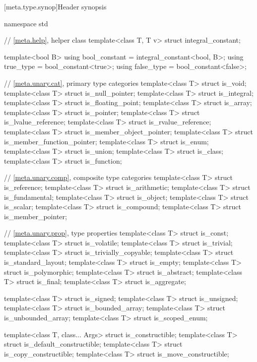 [meta.type.synop]{Header  synopsis}

%
\begin{codeblock}
namespace std {
  // \ref{meta.help}, helper class
  template<class T, T v> struct integral_constant;

  template<bool B>
    using bool_constant = integral_constant<bool, B>;
  using true_type  = bool_constant<true>;
  using false_type = bool_constant<false>;

  // \ref{meta.unary.cat}, primary type categories
  template<class T> struct is_void;
  template<class T> struct is_null_pointer;
  template<class T> struct is_integral;
  template<class T> struct is_floating_point;
  template<class T> struct is_array;
  template<class T> struct is_pointer;
  template<class T> struct is_lvalue_reference;
  template<class T> struct is_rvalue_reference;
  template<class T> struct is_member_object_pointer;
  template<class T> struct is_member_function_pointer;
  template<class T> struct is_enum;
  template<class T> struct is_union;
  template<class T> struct is_class;
  template<class T> struct is_function;

  // \ref{meta.unary.comp}, composite type categories
  template<class T> struct is_reference;
  template<class T> struct is_arithmetic;
  template<class T> struct is_fundamental;
  template<class T> struct is_object;
  template<class T> struct is_scalar;
  template<class T> struct is_compound;
  template<class T> struct is_member_pointer;

  // \ref{meta.unary.prop}, type properties
  template<class T> struct is_const;
  template<class T> struct is_volatile;
  template<class T> struct is_trivial;
  template<class T> struct is_trivially_copyable;
  template<class T> struct is_standard_layout;
  template<class T> struct is_empty;
  template<class T> struct is_polymorphic;
  template<class T> struct is_abstract;
  template<class T> struct is_final;
  template<class T> struct is_aggregate;

  template<class T> struct is_signed;
  template<class T> struct is_unsigned;
  template<class T> struct is_bounded_array;
  template<class T> struct is_unbounded_array;
  template<class T> struct is_scoped_enum;

  template<class T, class... Args> struct is_constructible;
  template<class T> struct is_default_constructible;
  template<class T> struct is_copy_constructible;
  template<class T> struct is_move_constructible;

}
\end{codeblock}
